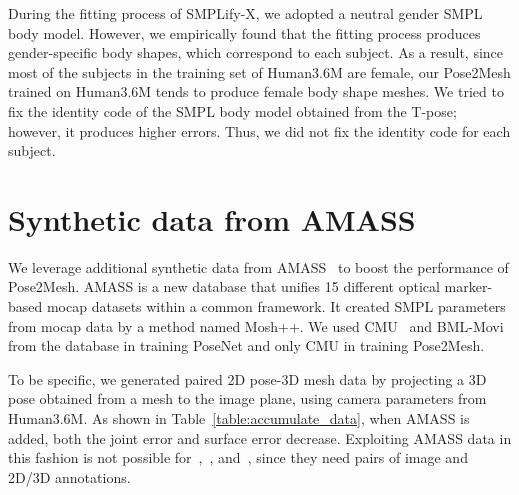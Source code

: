 \documentclass[runningheads]{llncs}
\begin{document}
During the fitting process of SMPLify-X, we adopted a neutral gender SMPL body model.
However, we empirically found that the fitting process produces gender-specific body shapes, which correspond to each subject.
As a result, since most of the subjects in the training set of Human3.6M are female, our Pose2Mesh trained on Human3.6M tends to produce female body shape meshes.
We tried to fix the identity code of the SMPL body model obtained from the T-pose; however, it produces higher errors.
Thus, we did not fix the identity code for each subject.

\begin{table}\centering
\setlength\tabcolsep{1.0pt}
\def\arraystretch{1.1}
\caption{The MPJPE comparison between SMPLify-X fitting results and state-of-the-art 3D human pose estimation methods. \enquote{*} takes multi-view RGB images as inputs.}
\vspace*{-7mm}
\label{table:smplify-x_error}
\end{table}

\section{Synthetic data from AMASS}\label{sec:amass}
We leverage additional synthetic data from AMASS~\cite{mahmood2019amass} to boost the performance of Pose2Mesh.
AMASS is a new database that unifies 15 different optical marker-based mocap datasets within a common framework.
It created SMPL parameters from mocap data by a method named Mosh++. 
We used CMU~\cite{cmumocap} and BML-Movi~\cite{ghorbani2020movi} from the database in training PoseNet and only CMU in training Pose2Mesh.

To be specific, we generated paired 2D pose-3D mesh data by projecting a 3D pose obtained from a mesh to the image plane, using camera parameters from Human3.6M.
As shown in Table~\ref{table:accumulate_data}, when AMASS is added, both the joint error and surface error decrease.
Exploiting AMASS data in this fashion is not possible for~\cite{kanazawa2018hmr},~\cite{kolotouros2019cmr}, and~\cite{kolotouros2019spin}, since they need pairs of image and 2D/3D annotations.
\end{document}

